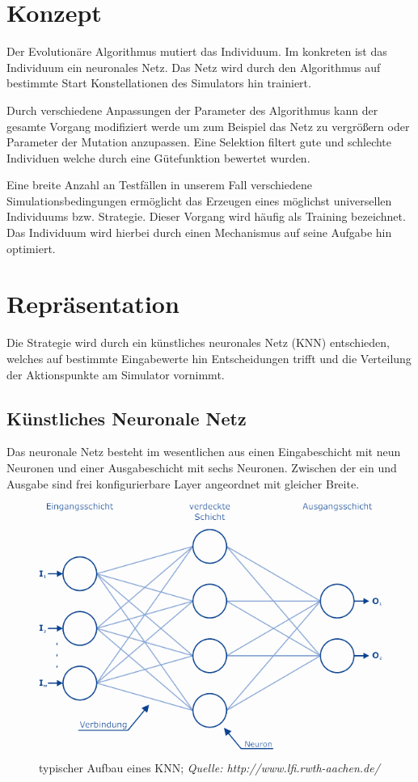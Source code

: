 \section{Konzept}
Der Evolutionäre Algorithmus mutiert das Individuum. Im konkreten ist das Individuum ein neuronales Netz. Das Netz wird durch den Algorithmus auf bestimmte Start Konstellationen des Simulators hin trainiert.

Durch verschiedene Anpassungen der Parameter des Algorithmus kann der gesamte Vorgang modifiziert werde um zum Beispiel das Netz zu vergrößern oder Parameter der Mutation anzupassen. Eine Selektion filtert gute und schlechte Individuen welche durch eine Gütefunktion bewertet wurden.

Eine breite Anzahl an Testfällen in unserem Fall verschiedene Simulationsbedingungen ermöglicht das Erzeugen eines möglichst universellen Individuums bzw. Strategie. Dieser Vorgang wird häufig als Training bezeichnet. Das Individuum wird hierbei durch einen Mechanismus auf seine Aufgabe hin optimiert.

\section{Repräsentation}
Die Strategie wird durch ein künstliches neuronales Netz (KNN) entschieden, welches auf bestimmte Eingabewerte hin Entscheidungen trifft und die Verteilung der Aktionspunkte am Simulator vornimmt.

\subsection{Künstliches Neuronale Netz}

Das neuronale Netz besteht im wesentlichen aus einen Eingabeschicht mit neun Neuronen und einer Ausgabeschicht mit sechs Neuronen. Zwischen der ein und Ausgabe sind frei konfigurierbare Layer angeordnet mit gleicher Breite. 

\begin{figure}[h!]
\begin{center}
\includegraphics[scale=1.4]{images/knn}
\caption{typischer Aufbau eines KNN;\textit{ Quelle: http://www.lfi.rwth-aachen.de/}}
\label{KNN}
\end{center}
\end{figure}

